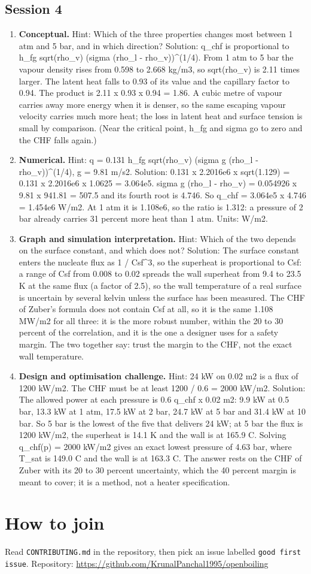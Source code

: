 \documentclass[11pt,a4paper]{article}
\begin{document}
\subsection*{Session 4}
\begin{enumerate}[nosep]
\item \textbf{Conceptual.} Hint: Which of the three properties changes most between 1 atm and 5 bar, and in which direction? Solution: q\_chf is proportional to h\_fg sqrt(rho\_v) (sigma (rho\_l - rho\_v))\textasciicircum{}(1/4). From 1 atm to 5 bar the vapour density rises from 0.598 to 2.668 kg/m3, so sqrt(rho\_v) is 2.11 times larger. The latent heat falls to 0.93 of its value and the capillary factor to 0.94. The product is 2.11 x 0.93 x 0.94 = 1.86. A cubic metre of vapour carries away more energy when it is denser, so the same escaping vapour velocity carries much more heat; the loss in latent heat and surface tension is small by comparison. (Near the critical point, h\_fg and sigma go to zero and the CHF falls again.)
\item \textbf{Numerical.} Hint: q = 0.131 h\_fg sqrt(rho\_v) (sigma g (rho\_l - rho\_v))\textasciicircum{}(1/4), g = 9.81 m/s2. Solution: 0.131 x 2.2016e6 x sqrt(1.129) = 0.131 x 2.2016e6 x 1.0625 = 3.064e5. sigma g (rho\_l - rho\_v) = 0.054926 x 9.81 x 941.81 = 507.5 and its fourth root is 4.746. So q\_chf = 3.064e5 x 4.746 = 1.454e6 W/m2. At 1 atm it is 1.108e6, so the ratio is 1.312: a pressure of 2 bar already carries 31 percent more heat than 1 atm. Units: W/m2.
\item \textbf{Graph and simulation interpretation.} Hint: Which of the two depends on the surface constant, and which does not? Solution: The surface constant enters the nucleate flux as 1 / Csf\textasciicircum{}3, so the superheat is proportional to Csf: a range of Csf from 0.008 to 0.02 spreads the wall superheat from 9.4 to 23.5 K at the same flux (a factor of 2.5), so the wall temperature of a real surface is uncertain by several kelvin unless the surface has been measured. The CHF of Zuber's formula does not contain Csf at all, so it is the same 1.108 MW/m2 for all three: it is the more robust number, within the 20 to 30 percent of the correlation, and it is the one a designer uses for a safety margin. The two together say: trust the margin to the CHF, not the exact wall temperature.
\item \textbf{Design and optimisation challenge.} Hint: 24 kW on 0.02 m2 is a flux of 1200 kW/m2. The CHF must be at least 1200 / 0.6 = 2000 kW/m2. Solution: The allowed power at each pressure is 0.6 q\_chf x 0.02 m2: 9.9 kW at 0.5 bar, 13.3 kW at 1 atm, 17.5 kW at 2 bar, 24.7 kW at 5 bar and 31.4 kW at 10 bar. So 5 bar is the lowest of the five that delivers 24 kW; at 5 bar the flux is 1200 kW/m2, the superheat is 14.1 K and the wall is at 165.9 C. Solving q\_chf(p) = 2000 kW/m2 gives an exact lowest pressure of 4.63 bar, where T\_sat is 149.0 C and the wall is at 163.3 C. The answer rests on the CHF of Zuber with its 20 to 30 percent uncertainty, which the 40 percent margin is meant to cover; it is a method, not a heater specification.
\end{enumerate}

\section{How to join}
Read \texttt{CONTRIBUTING.md} in the repository, then pick an issue labelled \texttt{good first issue}. Repository: \url{https://github.com/KrunalPanchal1995/openboiling}
\end{document}
